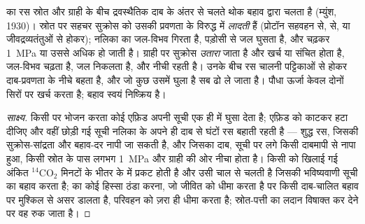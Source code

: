 \begin{theorem}[दाब-प्रवाह]\label{thm:b1:plant-transport:pressureflow}
 का रस स्रोत और ग्राही के बीच द्रवस्थैतिक दाब के अंतर से चलते थोक
बहाव द्वारा चलता है (म्युंश, 1930)। स्रोत पर सहचर  सुक्रोस को
उसकी प्रवणता के विरुद्ध  में \emph{लादती} हैं (प्रोटॉन
सहवहन से,  से, या जीवद्रव्यतंतुओं से होकर); नलिका का
जल-विभव गिरता है, पड़ोसी  से जल घुसता है, और  चढ़कर
\qty{1}{MPa} या उससे अधिक हो जाती है। ग्राही पर सुक्रोस \emph{उतारा}
जाता है और खर्च या संचित होता है, जल-विभव चढ़ता है, जल निकलता है, और
 नीची रहती है। उनके बीच रस चालनी पट्टिकाओं से होकर दाब-प्रवणता के
नीचे बहता है, और जो कुछ उसमें घुला है सब ढो ले जाता है। पौधा ऊर्जा केवल
दोनों सिरों पर खर्च करता है; बहाव स्वयं निष्क्रिय है।
\end{theorem}
\begin{proof}[साक्ष्य]
किसी  पर भोजन करता कोई एफ़िड अपनी सूची एक ही  में घुसा
देता है; एफ़िड को काटकर हटा दीजिए और वहीं छोड़ी गई सूची नलिका के अपने ही
दाब से घंटों रस बहाती रहती है --- शुद्ध  रस, जिसकी सुक्रोस-सांद्रता
और बहाव-दर नापी जा सकती है, और जिसका दाब, सूची पर लगे किसी दाबमापी से
नापा हुआ, किसी स्रोत के पास लगभग \qty{1}{MPa} और ग्राही की ओर नीचा होता
है। किसी  को खिलाई गई अंकित $\mathrm{^{14}CO_2}$ मिनटों के भीतर 
के  में प्रकट होती है और उसी चाल से चलती है जिसकी भविष्यवाणी सूची
का बहाव करता है;  का कोई हिस्सा ठंडा करना, जो जीवित  को धीमा
करता है पर किसी दाब-चालित बहाव पर मुश्किल से असर डालता है, परिवहन को
ज़रा ही धीमा करता है; स्रोत-पत्ती का लदान विषाक्त कर देने पर वह रुक जाता
है।
\end{proof}

